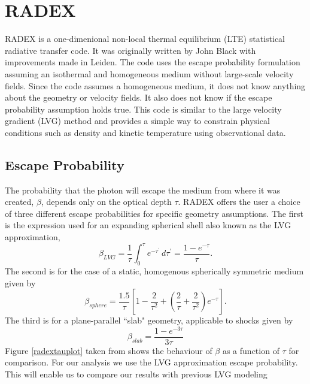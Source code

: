 \chapter{RADEX}\label{appendixRADEX}


RADEX \citep{2007A&A...468..627V} is a one-dimenional non-local thermal equilibrium (LTE) statistical radiative transfer code. It was originally written by John Black with improvements made in Leiden. The code uses the escape probability formulation assuming an isothermal and homogeneous medium without large-scale velocity fields. Since the code assumes a homogeneous medium, it does not know anything about the geometry or velocity fields. It also does not know if the escape probability assumption holds true. This code is similar to the large velocity gradient (LVG) method and provides a simple way to constrain physical conditions such as density and kinetic temperature using observational data. 

\section{Escape Probability}

 The probability that the photon will escape the medium from where it was created, $\beta$, depends only on the optical depth $\tau$. RADEX offers the user a choice of three different escape probabilities for specific geometry assumptions. The first is the expression used for an expanding spherical shell also known as the LVG approximation, 
 \begin{equation}
 \beta_{LVG} = \frac{1}{\tau} \int_0^\tau e^{-\tau^{\prime}}\,d\tau^{\prime} = \frac{1 - e^{-\tau}}{\tau}.
 \end{equation}
The second is for the case of a static, homogenous spherically symmetric medium given by
\begin{equation}
\beta_{sphere} = \frac{1.5}{\tau}\left[ 1- \frac{2}{\tau^{2}} +\left(\frac{2}{\tau} + \frac{2}{\tau^{2}}\right)e^{-\tau}\right].
\end{equation}
The third is for a plane-parallel ``slab" geometry, applicable to shocks given by
\begin{equation}
\beta_{slab} = \frac{1-e^{-3\tau}}{3\tau}
\end{equation}
Figure \ref{radextauplot} taken from \citet{2007A&A...468..627V} shows the behaviour of $\beta$ as a function of $\tau$ for comparison. For our analysis we use the LVG approximation escape probability. This will enable us to compare our results with previous LVG modeling 

